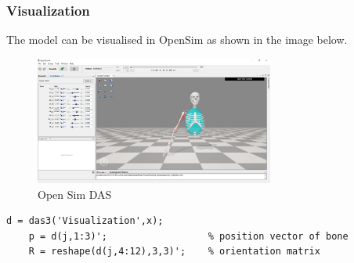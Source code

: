 \subsubsection{Visualization}

The model can be visualised in OpenSim as shown in the image below. 
\begin{figure}[h]
    \centering
    \includegraphics[width=0.7\textwidth]{Pictures/OpenSimModel.png}
    \caption{Open Sim DAS}
    \label{fig:OpenSimDAS}
\end{figure}

\begin{lstlisting}[style=Matlab-editor]
    d = das3('Visualization',x);   
    p = d(j,1:3)';					% position vector of bone
	R = reshape(d(j,4:12),3,3)';	% orientation matrix
 \end{lstlisting}
 